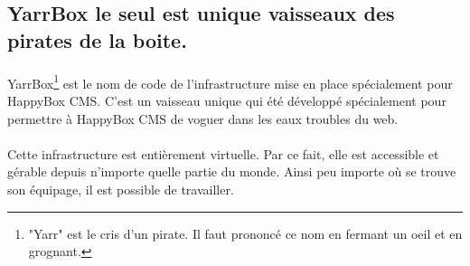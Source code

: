 \documentclass[11pt, a4paper ]{article}
\let\stdsection\section
\renewcommand\section{\newpage\stdsection}
\begin{document}
\begin{spacing}{1.5}













	\section{YarrBox le seul est unique vaisseaux des pirates de la boite.} %




\paragraph{}
YarrBox\footnote{"Yarr" est le cris d'un pirate. Il faut prononcé ce nom en fermant un oeil et en grognant.} est le nom de code de l'infrastructure mise en place spécialement pour HappyBox CMS. C'est un vaisseau unique qui été  développé spécialement pour permettre à HappyBox CMS de voguer dans les eaux troubles du web.
\paragraph{}
Cette infrastructure est entièrement virtuelle. Par ce fait, elle est accessible et gérable depuis n'importe quelle partie du monde. Ainsi peu importe où se trouve son équipage, il est possible de travailler.

\end{spacing}
\end{document}

